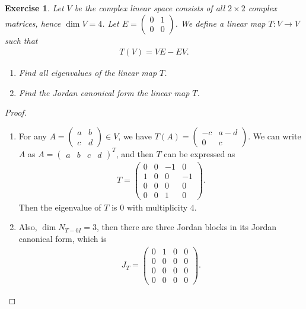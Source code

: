 \documentclass[11pt]{book}
\newtheorem{exercise}{Exercise}[section]
\theoremstyle{definition}
\numberwithin{equation}{chapter}
\begin{document}
\begin{exercise}
Let $V$ be the complex linear space consists of all $2 \times 2$ complex matrices, hence $\dim V = 4$. Let $E = \begin{pmatrix} 0 & 1 \\ 0 & 0 \end{pmatrix}$. We define a linear map $T: V \to V$ such that 
\begin{align*}
    T(V) = VE - EV.
\end{align*}
\begin{enumerate}[label=(\alph*)]
    \item Find all eigenvalues of the linear map $T$.
    
     \item Find the Jordan canonical form the linear map $T$.
\end{enumerate}
\end{exercise}
\begin{proof}
~\begin{enumerate}[label=(\alph*)]
    \item For any $A = \begin{pmatrix} a & b \\ c & d \end{pmatrix} \in V$, we have $T(A) = \begin{pmatrix} -c & a-d \\ 0 & c \end{pmatrix}$. We can write $A$ as $A = \begin{pmatrix} a & b & c & d \end{pmatrix}^T$, and then $T$ can be expressed as
    \begin{align*}
        T = \begin{pmatrix}
            0 & 0 & -1 & 0 \\
            1 & 0 & 0 & -1 \\
            0 & 0 & 0 & 0  \\
            0 & 0 & 1 & 0
        \end{pmatrix}.
    \end{align*}
    Then the eigenvalue of $T$ is $0$ with multiplicity $4$.
    
    \item Also, $\dim N_{T-0I} = 3$, then there are three Jordan blocks in its Jordan canonical form, which is
    \begin{align*}
        J_T = \begin{pmatrix}
            0 & 1 & 0 & 0 \\
            0 & 0 & 0 & 0 \\
            0 & 0 & 0 & 0  \\
            0 & 0 & 0 & 0
        \end{pmatrix}.
    \end{align*}
\end{enumerate}
\end{proof}
\end{document}
